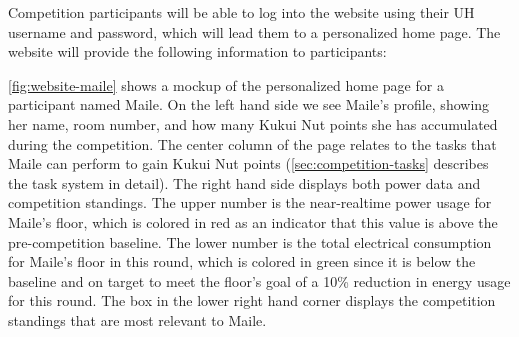 Competition participants will be able to log into the website using their UH username and password, which will lead them to a personalized home page. The website will provide the following information to participants:


\autoref{fig:website-maile} shows a mockup of the personalized home page for a participant named Maile. On the left hand side we see Maile's profile, showing her name, room number, and how many Kukui Nut points she has accumulated during the competition. The center column of the page relates to the tasks that Maile can perform to gain Kukui Nut points (\autoref{sec:competition-tasks} describes the task system in detail). The right hand side displays both power data and competition standings. The upper number is the near-realtime power usage for Maile's floor, which is colored in red as an indicator that this value is above the pre-competition baseline. The lower number is the total electrical consumption for Maile's floor in this round, which is colored in green since it is below the baseline and on target to meet the floor's goal of a 10\% reduction in energy usage for this round. The box in the lower right hand corner displays the competition standings that are most relevant to Maile.


